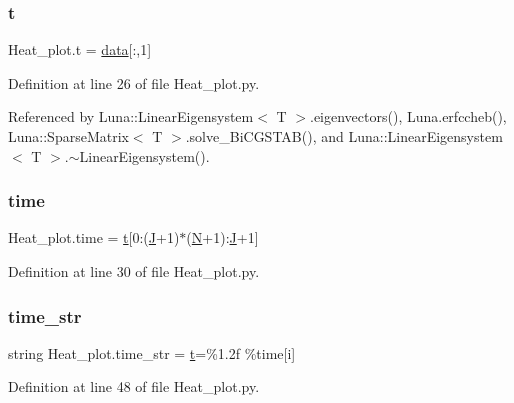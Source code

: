 \subsubsection{\texorpdfstring{t}{t}}
{\footnotesize\ttfamily Heat\+\_\+plot.\+t = \hyperlink{namespaceHeat__plot_a5f174ddffb3702db438b5922b832de2d}{data}\mbox{[}\+:,1\mbox{]}}



Definition at line 26 of file Heat\+\_\+plot.\+py.



Referenced by Luna\+::\+Linear\+Eigensystem$<$ T $>$.\+eigenvectors(), Luna.\+erfccheb(), Luna\+::\+Sparse\+Matrix$<$ T $>$.\+solve\+\_\+\+Bi\+C\+G\+S\+T\+A\+B(), and Luna\+::\+Linear\+Eigensystem$<$ T $>$.$\sim$\+Linear\+Eigensystem().

\mbox{\label{namespaceHeat__plot_a05e6ef830fa9da56c9ca594a34b644be}} 
\subsubsection{\texorpdfstring{time}{time}}
{\footnotesize\ttfamily Heat\+\_\+plot.\+time = \hyperlink{namespaceHeat__plot_a25a93a2226128530145cc611f350163b}{t}\mbox{[}0\+:(\hyperlink{namespaceHeat__plot_a3cafcec38d886f33b35756791964bb58}{J}+1)$\ast$(\hyperlink{namespaceHeat__plot_a7d050092798e28458a263710837bda77}{N}+1)\+:\hyperlink{namespaceHeat__plot_a3cafcec38d886f33b35756791964bb58}{J}+1\mbox{]}}



Definition at line 30 of file Heat\+\_\+plot.\+py.

\mbox{\label{namespaceHeat__plot_aabc2a130604c7629b0aafa54317bbd73}} 
\subsubsection{\texorpdfstring{time\+\_\+str}{time\_str}}
{\footnotesize\ttfamily string Heat\+\_\+plot.\+time\+\_\+str = \textquotesingle{}\hyperlink{namespaceHeat__plot_a25a93a2226128530145cc611f350163b}{t}=\%1.\+2f\textquotesingle{} \%time\mbox{[}i\mbox{]}}



Definition at line 48 of file Heat\+\_\+plot.\+py.

